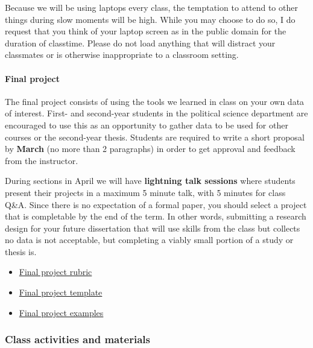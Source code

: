 \documentclass[
]{article}
\providecommand{\tightlist}{%
  \setlength{\itemsep}{0pt}\setlength{\parskip}{0pt}}
\begin{document}
Because we will be using laptops every class, the temptation to attend
to other things during slow moments will be high. While you may choose
to do so, I do request that you think of your laptop screen as in the
public domain for the duration of classtime. Please do not load anything
that will distract your classmates or is otherwise inappropriate to a
classroom setting.

\hypertarget{final-project}{%
\paragraph{Final project}\label{final-project}}

The final project consists of using the tools we learned in class on
your own data of interest. First- and second-year students in the
political science department are encouraged to use this as an
opportunity to gather data to be used for other courses or the
second-year thesis. Students are required to write a short proposal by
\textbf{March} (no more than 2 paragraphs) in order to get approval and
feedback from the instructor.

During sections in April we will have \textbf{lightning talk sessions}
where students present their projects in a maximum 5 minute talk, with 5
minutes for class Q\&A. Since there is no expectation of a formal paper,
you should select a project that is completable by the end of the term.
In other words, submitting a research design for your future
dissertation that will use skills from the class but collects no data is
not acceptable, but completing a viably small portion of a study or
thesis is.

\begin{itemize}
\tightlist
\item
  \href{https://github.com/jaeyk/PS239T/blob/master/final_projects/rubric.md}{Final
  project rubric}
\item
  \href{https://github.com/jaeyk/PS239T/tree/master/final_projects/template}{Final
  project template}
\item
  \href{https://github.com/jaeyk/PS239T/blob/master/final_projects/template/past_projects.md}{Final
  project examples}
\end{itemize}

\hypertarget{class-activities-and-materials}{%
\subsubsection{Class activities and
materials}\label{class-activities-and-materials}}
\end{document}
